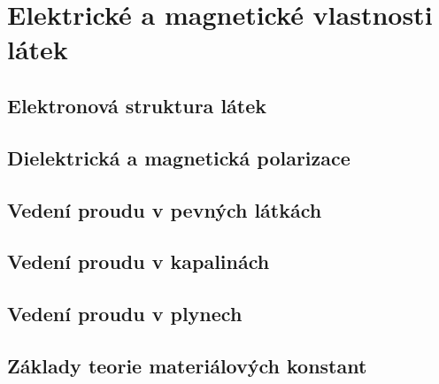 \graphicspath{{../src/FYZ/img/}}
\setchaptertoc
\chapter{Elektrické a magnetické vlastnosti látek}\label{fyz:IIIchapVII}
  \section{Elektronová struktura látek}\label{fyz:IIIchapVIIsecI}
  \section{Dielektrická a magnetická polarizace}\label{fyz:IIIchapVIIsecII}
  \section{Vedení proudu v pevných látkách}\label{fyz:IIIchapVIIsecIII}
  \section{Vedení proudu v kapalinách}\label{fyz:IIIchapVIIsecIV}
  \section{Vedení proudu v plynech}\label{fyz:IIIchapVIIsecV}
  \section{Základy teorie materiálových konstant}\label{fyz:IIIchapVIIsecV}

